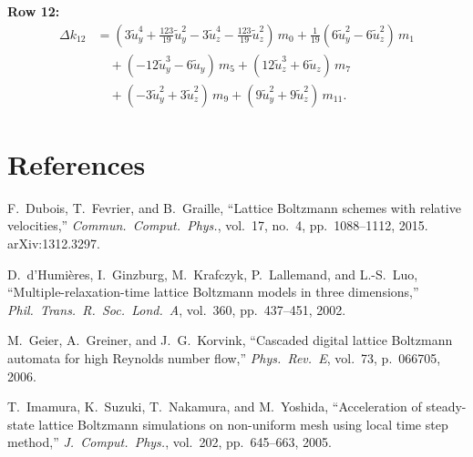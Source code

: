 \documentclass[11pt,a4paper]{article}
\newcommand{\tu}{\tilde{u}}
\begin{document}
\noindent\textbf{Row 12:}
\begin{align}
  \Delta k_{12} &= (3\tu_y^4 + \tfrac{123}{19}\tu_y^2 - 3\tu_z^4 - \tfrac{123}{19}\tu_z^2)\,m_0 + \tfrac{1}{19}(6\tu_y^2 - 6\tu_z^2)\,m_1 \nonumber\\
  &\quad + (-12\tu_y^3 - 6\tu_y)\,m_5 + (12\tu_z^3 + 6\tu_z)\,m_7 \nonumber\\
  &\quad + (-3\tu_y^2 + 3\tu_z^2)\,m_9 + (9\tu_y^2 + 9\tu_z^2)\,m_{11}. \label{eq:delta12}
\end{align}

\section*{References}

\begin{enumerate}[label={[\arabic*]},nosep]
  \item F.~Dubois, T.~Fevrier, and B.~Graille, ``Lattice Boltzmann schemes with relative velocities,'' \textit{Commun.\ Comput.\ Phys.}, vol.~17, no.~4, pp.~1088--1112, 2015. arXiv:1312.3297.
  \item D.~d'Humi\`eres, I.~Ginzburg, M.~Krafczyk, P.~Lallemand, and L.-S.~Luo, ``Multiple-relaxation-time lattice Boltzmann models in three dimensions,'' \textit{Phil.\ Trans.\ R.\ Soc.\ Lond.\ A}, vol.~360, pp.~437--451, 2002.
  \item M.~Geier, A.~Greiner, and J.~G.~Korvink, ``Cascaded digital lattice Boltzmann automata for high Reynolds number flow,'' \textit{Phys.\ Rev.\ E}, vol.~73, p.~066705, 2006.
  \item T.~Imamura, K.~Suzuki, T.~Nakamura, and M.~Yoshida, ``Acceleration of steady-state lattice Boltzmann simulations on non-uniform mesh using local time step method,'' \textit{J.~Comput.\ Phys.}, vol.~202, pp.~645--663, 2005.
\end{enumerate}
\end{document}
